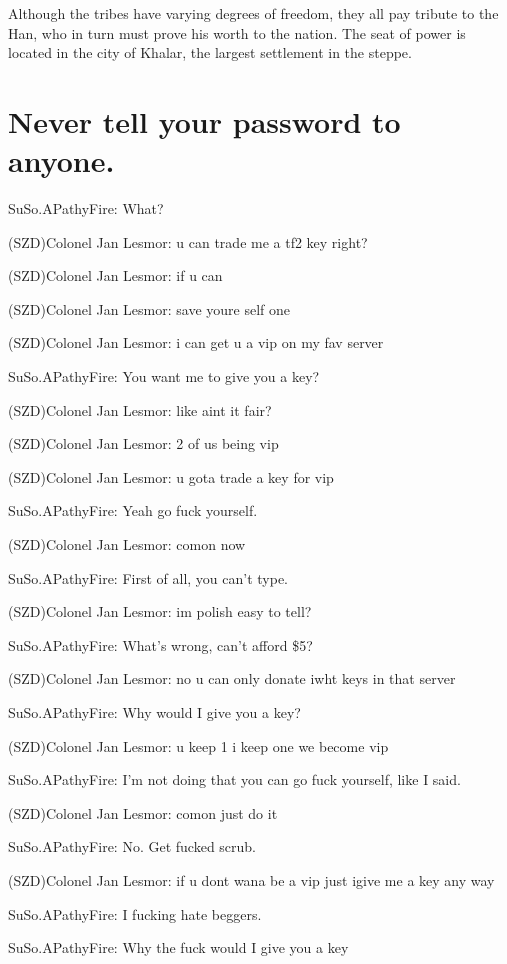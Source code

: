 \documentclass[a1paper]{article}
\begin{document}
\begin{multicols}{7}
{Although the tribes have varying degrees of freedom, they all pay tribute to the Han, who in turn must prove his worth to the nation. The seat of power is located in the city of Khalar, the largest settlement in the steppe.




\section{Never tell your password to anyone.}
\setlength{\parskip}{0cm}

SuSo.APathyFire: What?

(SZD)Colonel Jan Lesmor: u can trade me a tf2 key right?

(SZD)Colonel Jan Lesmor: if u can

(SZD)Colonel Jan Lesmor: save youre self one

(SZD)Colonel Jan Lesmor: i can get u a vip on my fav server

SuSo.APathyFire: You want me to give you a key?

(SZD)Colonel Jan Lesmor: like aint it fair?

(SZD)Colonel Jan Lesmor: 2 of  us being vip

(SZD)Colonel Jan Lesmor: u gota trade a key for vip

SuSo.APathyFire: Yeah go fuck yourself.

(SZD)Colonel Jan Lesmor: comon now

SuSo.APathyFire: First of all, you can't type.

(SZD)Colonel Jan Lesmor: im polish easy to tell?

SuSo.APathyFire: What's wrong, can't afford \$5?

(SZD)Colonel Jan Lesmor: no u can only donate iwht keys in that server

SuSo.APathyFire: Why would I give you a key?

(SZD)Colonel Jan Lesmor: u keep 1 i keep one we become vip

SuSo.APathyFire: I'm not doing that you can go fuck yourself, like I said.

(SZD)Colonel Jan Lesmor: comon just do it

SuSo.APathyFire: No. Get fucked scrub.

(SZD)Colonel Jan Lesmor: if u dont wana be a vip just igive me a key any way

SuSo.APathyFire: I fucking hate beggers.

SuSo.APathyFire: Why the fuck would I give you a key

}
\end{multicols}
\end{document}
